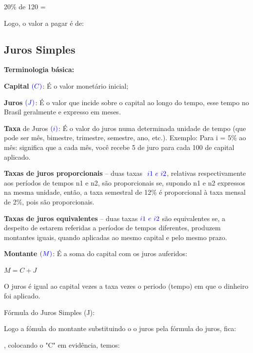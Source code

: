 \begin{multicols*}{2}
		20\% de 120  =  
		
		Logo, o valor a pagar é de: 
		
		\subsection{Juros Simples}
		
		\textbf{Terminologia básica:}
		
		\textbf{Capital} $\color{blue}(C)$: É o valor monetário inicial;
		
		\textbf{Juros} $\color{blue}(J)$: É o valor que incide sobre o capital ao longo do tempo, esse tempo no Brasil geralmente e expresso em meses.
		
		\textbf{Taxa} de Juros $\color{blue}(i)$: É o valor do juros numa determinada unidade de tempo (que pode ser mês, bimestre, trimestre, semestre, ano, etc.). Exemplo: Para i = 5\% ao mês: significa que a cada mês, você recebe 5 de juro para cada 100 de capital aplicado.
		
		\textbf{Taxas de juros proporcionais} – duas taxas  $\color{blue} \ i1\ e \ i2$, relativas respectivamente aos períodos de tempos n1 e n2, são proporcionais se, supondo n1 e n2 expressos na mesma unidade, então, a taxa semestral de 12\% é proporcional à taxa mensal de 2\%, pois são proporcionais.

		\textbf{Taxas de juros equivalentes} – duas taxas$\color{blue} \  i1 \ e \ i2$ são equivalentes se, a despeito de estarem referidas a períodos de tempos diferentes, produzem montantes iguais, quando aplicadas ao mesmo capital e pelo mesmo prazo.

		\textbf{Montante} $\color{blue}(M)$: É a soma do capital com os juros auferidos:
		
		\textbf{\color{blue}$M = C + J$}
		
		O juros é igual ao capital vezes a taxa vezes o periodo (tempo) em que o dinheiro foi aplicado.		
		
		Fórmula do Juros Simples (J):
		
		\textbf{}
		
		Logo a fómula do montante substituindo o o juros pela fórmula do juros, fica:
		
		\textbf{}, colocando o "C" em evidência, temos:
		
		\textbf{}\\
		

\end{multicols*}
